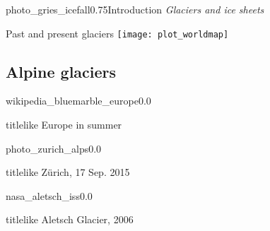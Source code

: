 
    \begin{sectionframe}{photo_gries_icefall}{0.75}{Introduction}
      \emph{Glaciers and ice sheets}
    \end{sectionframe}

    \begin{frame}{Past and present glaciers}
      \centering
      \texttt{[image: plot\_worldmap]}
    \end{frame}

\subsection{Alpine glaciers}


    \begin{backgroundframe}[t]{wikipedia_bluemarble_europe}{0.0}{}
      \vspace{1em}\hfill
      \begin{beamercolorbox}[sep=1em,wd=40mm]{titlelike}
        Europe in summer
      \end{beamercolorbox}
    \end{backgroundframe}

    \begin{backgroundframe}{photo_zurich_alps}{0.0}{}
      \vspace{6cm}
      \begin{beamercolorbox}[sep=1em,wd=45mm]{titlelike}
        Zürich, 17 Sep. 2015
      \end{beamercolorbox}
    \end{backgroundframe}


    \begin{backgroundframe}{nasa_aletsch_iss}{0.0}{}
      \hfill
      \begin{beamercolorbox}[sep=1em,wd=45mm]{titlelike}
        Aletsch Glacier, 2006
      \end{beamercolorbox}
      \vspace{6cm}
    \end{backgroundframe}

